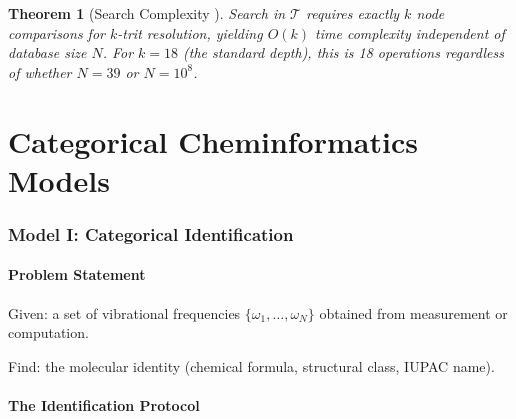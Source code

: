 \documentclass[11pt,twocolumn,a4paper]{article}
\newtheorem{theorem}{Theorem}[section]
\theoremstyle{definition}
\theoremstyle{remark}
\newcommand{\Trie}{\mathcal{T}}
\begin{document}
\begin{theorem}[Search Complexity {\citep[Theorem~6.2]{sachikonye2025c}}]
\label{thm:search_complexity}
Search in $\Trie$ requires exactly $k$ node comparisons for $k$-trit resolution, yielding $O(k)$ time complexity independent of database size $N$. For $k = 18$ (the standard depth), this is 18 operations regardless of whether $N = 39$ or $N = 10^8$.
\end{theorem}



\part{Categorical Cheminformatics Models}

\section{Model I: Categorical Identification}
\label{sec:model1}

\subsection{Problem Statement}

Given: a set of vibrational frequencies $\{\omega_1, \ldots, \omega_N\}$ obtained from measurement or computation.

Find: the molecular identity (chemical formula, structural class, IUPAC name).

\subsection{The Identification Protocol}
\end{document}
